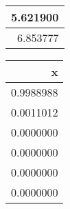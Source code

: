 \documentclass{article}
\begin{document}
\begin{table}[]
\begin{table}
\begin{tabular}[t]{r}
\hline
5.621900\\
\hline
6.853777\\
\hline
\end{tabular}
\centering
\begin{tabular}[t]{r}
\hline
x\\
\hline
0.9988988\\
\hline
0.0011012\\
\hline
0.0000000\\
\hline
0.0000000\\
\hline
0.0000000\\
\hline
0.0000000\\
\hline
\end{tabular}
\end{table}
\end{table}
\end{document}
